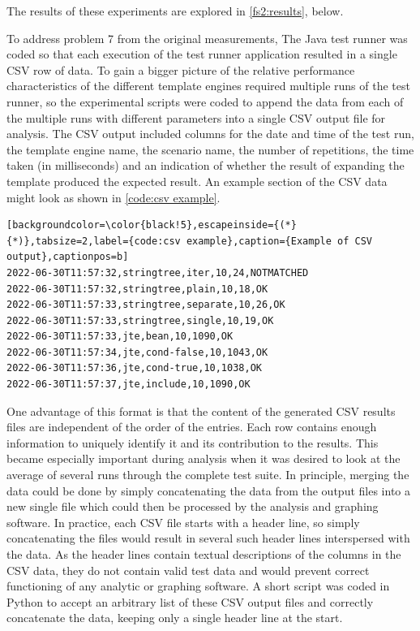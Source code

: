 The results of these experiments are explored in \autoref{fs2:results}, below.

To address problem 7 from the original measurements, The Java test runner was coded so that each execution of the test runner application resulted in a single CSV row of data. To gain a bigger picture of the relative performance characteristics of the different template engines required multiple runs of the test runner, so the experimental scripts were coded to append the data from each of the multiple runs with different parameters into a single CSV output file for analysis. The CSV output included columns for the date and time of the test run, the template engine name, the scenario name, the number of repetitions, the time taken (in milliseconds) and an indication of whether the result of expanding the template produced the expected result. An example section of the CSV data might look as shown in \autoref{code:csv example}.

\begin{lstlisting}[backgroundcolor=\color{black!5},escapeinside={(*}{*)},tabsize=2,label={code:csv example},caption={Example of CSV output},captionpos=b]
2022-06-30T11:57:32,stringtree,iter,10,24,NOTMATCHED
2022-06-30T11:57:32,stringtree,plain,10,18,OK
2022-06-30T11:57:33,stringtree,separate,10,26,OK
2022-06-30T11:57:33,stringtree,single,10,19,OK
2022-06-30T11:57:33,jte,bean,10,1090,OK
2022-06-30T11:57:34,jte,cond-false,10,1043,OK
2022-06-30T11:57:36,jte,cond-true,10,1038,OK
2022-06-30T11:57:37,jte,include,10,1090,OK
\end{lstlisting}

One advantage of this format is that the content of the generated CSV results files are independent of the order of the entries. Each row contains enough information to uniquely identify it and its contribution to the results. This became especially important during analysis when it was desired to look at the average of several runs through the complete test suite. In principle, merging the data could be done by simply concatenating the data from the output files into a new single file which could then be processed by the analysis and graphing software. In practice, each CSV file starts with a header line, so simply concatenating the files would result in several such header lines interspersed with the data. As the header lines contain textual descriptions of the columns in the CSV data, they do not contain valid test data and would prevent correct functioning of any analytic or graphing software. A short script was coded in Python to accept an arbitrary list of these CSV output files and correctly concatenate the data, keeping only a single header line at the start.


